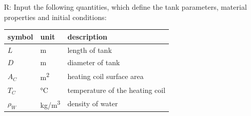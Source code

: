 \documentclass[12pt]{article}
\newcounter{reqnum} %
\begin{document}
\noindent \begin{itemize}

\item[R\refstepcounter{reqnum}\thereqnum \label{R_RawInputs}:] Input the following
  quantities, which define the tank parameters, material properties and initial
  conditions:

  \renewcommand{\arraystretch}{1.2}
  \noindent \begin{tabular}{l l p{12cm}} \toprule
              \textbf{symbol} & \textbf{unit} & \textbf{description}\\
              \midrule 
              $L$ & \si{\metre} & length of tank\\
              $D$ & \si{\metre} & diameter of tank\\
              $A_C$ & \si[per-mode=symbol] {\square\metre} & heating coil surface area\\
              $T_C$ &\si[per-mode=symbol] {\celsius} & temperature of the heating coil\\
              $\rho_W$ & \si[per-mode=symbol] {\kilogram\per\cubic\metre} &
                                                          density of water\\

\end{tabular}
\end{itemize}
\end{document}
